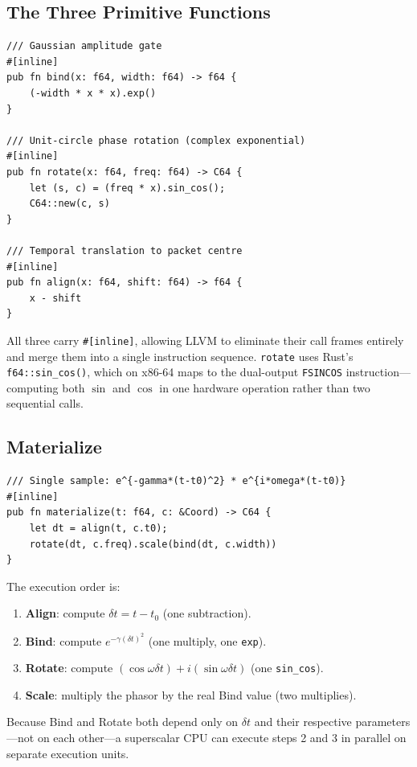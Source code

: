 \documentclass[11pt,a4paper]{article}
\theoremstyle{definition}
\newcommand{\CB}[1]{\texttt{#1}}
\begin{document}
\subsection{The Three Primitive Functions}

\begin{lstlisting}[caption={Bind, Rotate, Align --- three inlined primitives},label={lst:three}]
/// Gaussian amplitude gate
#[inline]
pub fn bind(x: f64, width: f64) -> f64 {
    (-width * x * x).exp()
}

/// Unit-circle phase rotation (complex exponential)
#[inline]
pub fn rotate(x: f64, freq: f64) -> C64 {
    let (s, c) = (freq * x).sin_cos();
    C64::new(c, s)
}

/// Temporal translation to packet centre
#[inline]
pub fn align(x: f64, shift: f64) -> f64 {
    x - shift
}
\end{lstlisting}

All three carry \CB{\#[inline]}, allowing LLVM to eliminate their call
frames entirely and merge them into a single instruction sequence.
\CB{rotate} uses Rust's \CB{f64::sin\_cos()}, which on x86-64 maps to
the dual-output \texttt{FSINCOS} instruction---computing both
$\sin$ and $\cos$ in one hardware operation rather than two sequential
calls.

\subsection{Materialize}

\begin{lstlisting}[caption={materialize: composes all three operations for one sample},label={lst:mat}]
/// Single sample: e^{-gamma*(t-t0)^2} * e^{i*omega*(t-t0)}
#[inline]
pub fn materialize(t: f64, c: &Coord) -> C64 {
    let dt = align(t, c.t0);
    rotate(dt, c.freq).scale(bind(dt, c.width))
}
\end{lstlisting}

The execution order is:
\begin{enumerate}
  \item \textbf{Align}: compute $\delta t = t - t_0$ (one subtraction).
  \item \textbf{Bind}: compute $e^{-\gamma(\delta t)^2}$ (one multiply, one \CB{exp}).
  \item \textbf{Rotate}: compute $(\cos\omega\delta t) + i(\sin\omega\delta t)$
        (one \CB{sin\_cos}).
  \item \textbf{Scale}: multiply the phasor by the real Bind value (two multiplies).
\end{enumerate}
Because Bind and Rotate both depend only on $\delta t$ and
their respective parameters---not on each other---a superscalar CPU
can execute steps 2 and 3 in parallel on separate execution units.
\end{document}
